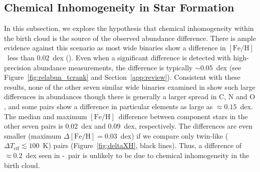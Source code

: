 \documentclass[modern, letterpaper]{aastex61}
\newcommand{\sectionname}{Section}
\newcommand{\figname}{Figure}
\newcommand*\elem[1]{\ensuremath{\mathrm{#1}}}
\newcommand*\elemH[1]{\ensuremath{[\mathrm{#1}/\elem{H}]}}
\newcommand*{\feh}{\ensuremath{\elemH{Fe}}}
\newcommand{\sunanalog}{\text{Krios}}
\newcommand{\bizarreone}{\text{Kronos}}
\begin{document}
\subsection{Chemical Inhomogeneity in Star Formation}
\label{sub:chemical_inhomogeneity_in_star_formation}

In this subsection, we explore the hypothesis that chemical inhomogeneity
within the birth cloud is the source of the observed abundance difference.
There is ample evidence against this scenario as most wide binaries show a
difference in \feh\ less than $0.02$~dex
(\citealt{Desidera:2004aa,Gratton:2001aa}).
Even when a significant difference is detected with high-precision abundance
measurements, the difference is typically $\sim 0.05$~dex (see
\figname~\ref{fig:relabun_tcrank} and \sectionname~\ref{app:review}).
Consistent with these results, none of the other seven similar wide binaries
examined in \citealt{2016ApJS..225...32B} show such large differences in
abundances though there is generally a larger spread in $\elem{C}$, $\elem{N}$
and $\elem{O}$, and some pairs show a difference in particular elements as
large as $\approx 0.15$~dex.
The median and maximum \feh\ difference between component stars in the other
seven pairs is $0.02$~dex and $0.09$~dex, respectively.
The differences are even smaller (maximum $\Delta\feh = 0.03$~dex) if we
compare only twin-like ($\Delta T_\mathrm{eff} \lesssim 100$~K) pairs
(\figname~\ref{fig:deltaXH}, black lines).
Thus, a difference of $\approx 0.2$~dex seen in \bizarreone-\sunanalog\ pair is
unlikely to be due to chemical inhomogeneity in the birth cloud.
\end{document}
